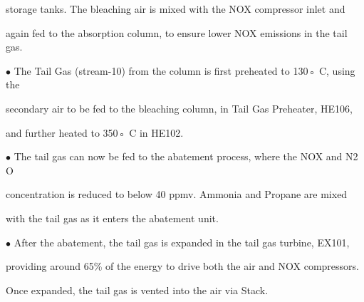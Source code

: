 \documentclass[a4paper,portrait,12pt]{article}
\begin{document}
\begin{flushleft}
storage tanks. The bleaching air is mixed with the NOX compressor inlet and
\end{flushleft}


\begin{flushleft}
again fed to the absorption column, to ensure lower NOX emissions in the tail gas.
\end{flushleft}


\begin{flushleft}
$\bullet$ The Tail Gas (stream-10) from the column is first preheated to 130◦ C, using the
\end{flushleft}


\begin{flushleft}
secondary air to be fed to the bleaching column, in Tail Gas Preheater, HE106,
\end{flushleft}


\begin{flushleft}
and further heated to 350◦ C in HE102.
\end{flushleft}


\begin{flushleft}
$\bullet$ The tail gas can now be fed to the abatement process, where the NOX and N2 O
\end{flushleft}


\begin{flushleft}
concentration is reduced to below 40 ppmv. Ammonia and Propane are mixed
\end{flushleft}


\begin{flushleft}
with the tail gas as it enters the abatement unit.
\end{flushleft}


\begin{flushleft}
$\bullet$ After the abatement, the tail gas is expanded in the tail gas turbine, EX101,
\end{flushleft}


\begin{flushleft}
providing around 65\% of the energy to drive both the air and NOX compressors.
\end{flushleft}


\begin{flushleft}
Once expanded, the tail gas is vented into the air via Stack.
\end{flushleft}
\end{document}
